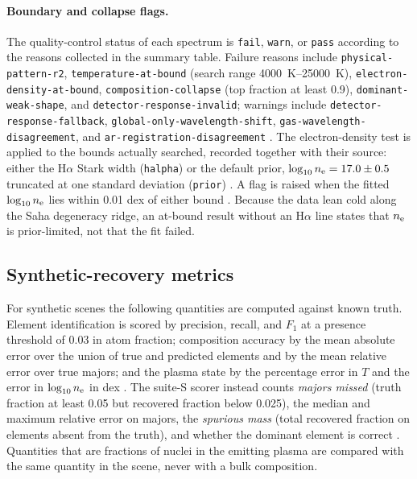 \paragraph{Boundary and collapse flags.}
The quality-control status of each spectrum is \texttt{fail}, \texttt{warn}, or \texttt{pass} according to the reasons collected in the summary table. Failure reasons include \texttt{physical-pattern-r2}, \texttt{temperature-at-bound} (search range \SIrange{4000}{25000}{\kelvin}), \texttt{electron-density-at-bound}, \texttt{composition-collapse} (top fraction at least 0.9), \texttt{dominant-weak-shape}, and \texttt{detector-response-invalid}; warnings include \texttt{detector-response-fallback}, \texttt{global-only-wavelength-shift}, \texttt{gas-wavelength-disagreement}, and \texttt{ar-registration-disagreement} %
. The electron-density test is applied to the bounds actually searched, recorded together with their source: either the H$\alpha$ Stark width (\texttt{halpha}) or the default prior, $\log_{10}n_{\mathrm{e}}=17.0\pm0.5$ truncated at one standard deviation (\texttt{prior}) %
. A flag is raised when the fitted $\log_{10}n_{\mathrm{e}}$ lies within 0.01 dex of either bound %
. Because the data lean cold along the Saha degeneracy ridge, an at-bound result without an H$\alpha$ line states that $n_{\mathrm{e}}$ is prior-limited, not that the fit failed.

\subsection{Synthetic-recovery metrics}

For synthetic scenes the following quantities are computed against known truth. Element identification is scored by precision, recall, and $F_1$ at a presence threshold of 0.03 in atom fraction; composition accuracy by the mean absolute error over the union of true and predicted elements and by the mean relative error over true majors; and the plasma state by the percentage error in $T$ and the error in $\log_{10}n_{\mathrm{e}}$ in dex %
. The suite-S scorer instead counts \emph{majors missed} (truth fraction at least 0.05 but recovered fraction below 0.025), the median and maximum relative error on majors, the \emph{spurious mass} (total recovered fraction on elements absent from the truth), and whether the dominant element is correct %
. Quantities that are fractions of nuclei in the emitting plasma are compared with the same quantity in the scene, never with a bulk composition.

